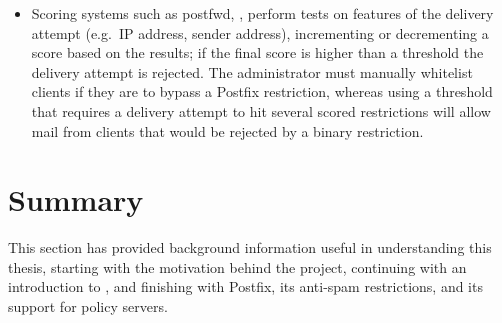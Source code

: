 \begin{itemize}

    \item Scoring systems such as postfwd,
        , perform tests on
        features of the delivery attempt (e.g.\ IP address, sender
        address), incrementing or decrementing a score based on the
        results; if the final score is higher than a threshold the delivery
        attempt is rejected.  The administrator must manually whitelist
        clients if they are to bypass a Postfix restriction, whereas using
        a threshold that requires a delivery attempt to hit several scored
        restrictions will allow mail from clients that would be rejected by
        a binary restriction.

\end{itemize}

\section{Summary}

This section has provided background information useful in understanding
this thesis, starting with the motivation behind the project, continuing
with an introduction to , and finishing with Postfix, its
anti-spam restrictions, and its support for policy servers.
